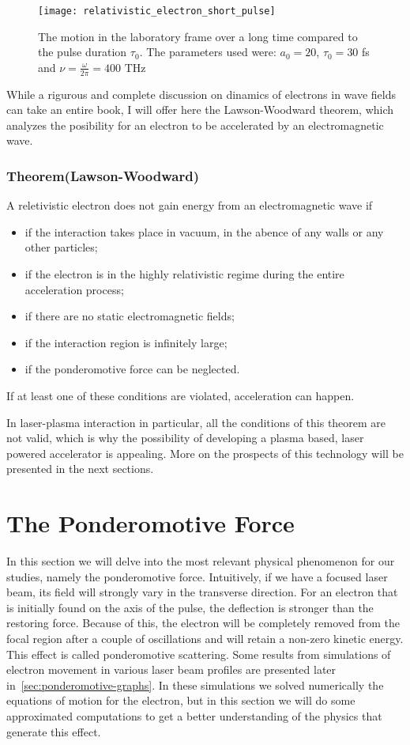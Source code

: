 \documentclass[12pt, class=report, crop=false]{standalone}
\begin{document}
\begin{figure}[h]
  \centering
  \texttt{[image: relativistic\_electron\_short\_pulse]}%
  \caption{The motion in the laboratory frame over a long time compared to the pulse duration \(\tau_0\). The parameters used were: \(a_0 = 20\), \(\tau_0 = 30\) fs and \(\nu=\frac{\omega}{2\pi} = 400\) THz}\label{fig:electron-motion-pulse}%
\end{figure}

While a rigurous and complete discussion on dinamics of electrons in wave fields can take an entire book, I will offer here the Lawson-Woodward theorem, which analyzes the posibility for an electron to be accelerated by an electromagnetic wave.

\subsubsection{Theorem(Lawson-Woodward)}
A reletivistic electron does not gain energy from an electromagnetic wave if
\begin{itemize}
  \item if the interaction takes place in vacuum, in the abence of any walls or any other particles;
  \item if the electron is in the highly relativistic regime during the entire acceleration process;
  \item if there are no static electromagnetic fields;
  \item if the interaction region is infinitely large;
  \item if the ponderomotive force can be neglected.
\end{itemize}
If at least one of these conditions are violated, acceleration can happen.
\newline

In laser-plasma interaction in particular, all the conditions of this theorem are not valid, which is why the possibility of developing a plasma based, laser powered accelerator is appealing. More on the prospects of this technology will be presented in the next sections.

\section{The Ponderomotive Force}

In this section we will delve into the most relevant physical phenomenon for our studies, namely the ponderomotive force. Intuitively, if we have a focused laser beam, its field will strongly vary in the transverse direction. For an electron that is initially found on the axis of the pulse, the deflection is stronger than the restoring force. Because of this, the electron will be completely removed from the focal region after a couple of oscillations and will retain a non-zero kinetic energy. This effect is called ponderomotive scattering. Some results from simulations of electron movement in various laser beam profiles are presented later in~\cref{sec:ponderomotive-graphs}. In these simulations we solved numerically the equations of motion for the electron, but in this section we will do some approximated computations to get a better understanding of the physics that generate this effect.
\end{document}
